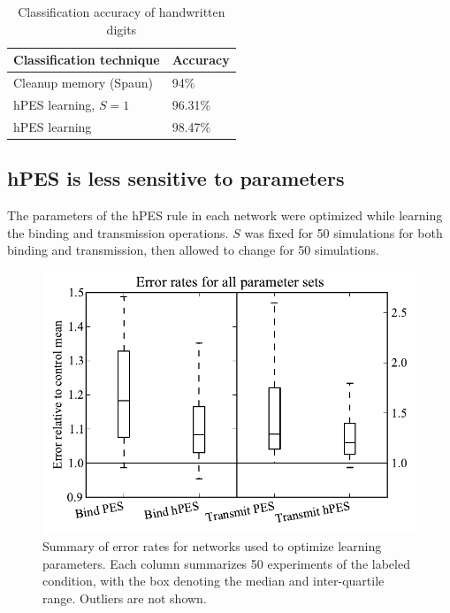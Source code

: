 \documentclass[10pt,letterpaper]{article}
\begin{document}
\begin{table}[!ht]
\begin{center} 
\caption{Classification accuracy of handwritten digits} 
\label{tab:digits} 
\vskip 0.12in
\begin{tabular}{ll} 
\hline
Classification technique & Accuracy \\
\hline
Cleanup memory (Spaun)   & 94\% \\
hPES learning, $S = 1$   & 96.31\% \\
hPES learning            & 98.47\% \\
\hline
\end{tabular} 
\end{center} 
\end{table}

\subsection{hPES is less sensitive to parameters}

The parameters of the hPES rule in each network
were optimized while learning
the binding and transmission operations.
$S$ was fixed for 50 simulations for both binding and transmission,
then allowed to change for 50 simulations.

\begin{figure}[ht]
\begin{center}
\includegraphics[width=\columnwidth]{fig5-param-boxplot}
\end{center}
\caption{Summary of error rates for networks used
  to optimize learning parameters. Each column
  summarizes 50 experiments of the labeled condition,
  with the box denoting the median and inter-quartile range.
  Outliers are not shown.}
\label{fig:params}
\end{figure}
\end{document}
